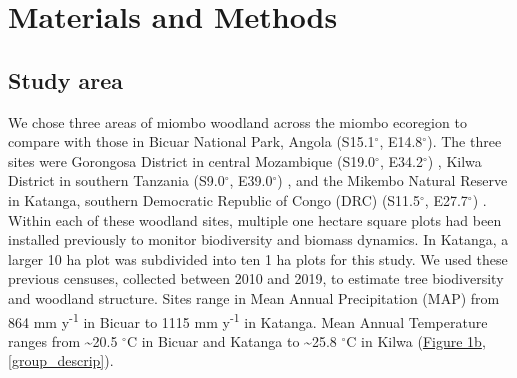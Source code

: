 \documentclass[diversity,article,submit,moreauthors,pdftex]{Definitions/mdpi}
\begin{document}
\section{Materials and Methods}

\subsection{Study area}

We chose three areas of miombo woodland across the miombo ecoregion to compare with those in Bicuar National Park, Angola (S15.1$^\circ$, E14.8$^\circ$). The three sites were Gorongosa District in central Mozambique (S19.0$^\circ$, E34.2$^\circ$) \citep{Ryan2011}, Kilwa District in southern Tanzania (S9.0$^\circ$, E39.0$^\circ$) \citep{McNicol2018}, and the Mikembo Natural Reserve in Katanga, southern Democratic Republic of Congo (DRC) (S11.5$^\circ$, E27.7$^\circ$) \citep{Muledi2017}. Within each of these woodland sites, multiple one hectare square plots had been installed previously to monitor biodiversity and biomass dynamics. In Katanga, a larger 10 ha plot was subdivided into ten 1 ha plots for this study. We used these previous censuses, collected between 2010 and 2019, to estimate tree biodiversity and woodland structure. Sites range in Mean Annual Precipitation (MAP) from 864 mm y\textsuperscript{-1} in Bicuar to 1115 mm y\textsuperscript{-1} in Katanga. Mean Annual Temperature ranges from \textasciitilde{}20.5 $^\circ$C in Bicuar and Katanga to \textasciitilde{}25.8 $^\circ$C in Kilwa (\hyperref[temp_precip]{Figure 1b}, \autoref{group_descrip}).
\end{document}
